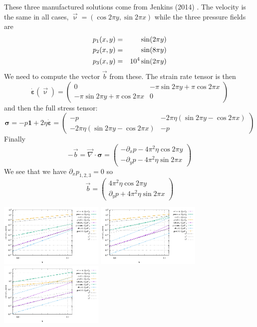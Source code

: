 These three manufactured solutions come from Jenkins \etal (2014) \cite{jejl14}.
The velocity is the same in all cases, $\vec{\upnu}=(\cos 2\pi y , \sin 2\pi x)$
while the three pressure fields are
\begin{eqnarray}
p_1(x,y) &=& \sin (2\pi y)  \nonumber\\
p_2(x,y) &=& \sin (8 \pi y)   \nonumber\\
p_3(x,y) &=& 10^4 \sin (2\pi y) \nonumber
\end{eqnarray}
We need to compute the vector $\vec{b}$ from these. 
The strain rate tensor is then 
\[
\dot{\bm \varepsilon}(\vec{\upnu}) = 
\left(
\begin{array}{cc}
0 &  - \pi \sin 2\pi y + \pi \cos 2 \pi x  \\
 - \pi \sin 2\pi y + \pi \cos 2 \pi x   & 0
\end{array}
\right)
\]
and then the full stress tensor:
\[
{\bm \sigma} = 
- p {\bm 1}+ 2 \eta \dot{\bm \varepsilon}
= \left(
\begin{array}{cc}
-p &  -2 \pi \eta (\sin 2\pi y -  \cos 2 \pi x)  \\
-2 \pi \eta (\sin 2\pi y -  \cos 2 \pi x)   & -p
\end{array}
\right)
\]
Finally
\[
-\vec{b} = 
\vec\nabla \cdot {\bm \sigma} = 
\left(
\begin{array}{c}
-\partial_x p - 4 \pi^2 \eta \cos 2\pi y  \\ 
-\partial_y p - 4 \pi^2 \eta \sin 2\pi x 
\end{array}
\right)
\]
We see that we have $\partial_x p_{1,2,3} =0$ so 
\[
\vec{b}
=
\left(
\begin{array}{c}
 4 \pi^2 \eta \cos 2\pi y  \\ 
\partial_y p + 4 \pi^2 \eta \sin 2\pi x 
\end{array}
\right)
\]

\begin{center}
\includegraphics[width=5cm]{python_codes/fieldstone_104/results/exp3/errors.pdf}
\includegraphics[width=5cm]{python_codes/fieldstone_104/results/exp4/errors.pdf}
\includegraphics[width=5cm]{python_codes/fieldstone_104/results/exp5/errors.pdf}
\end{center}

